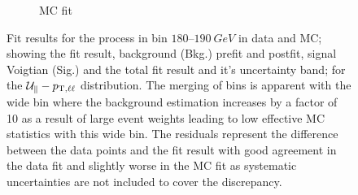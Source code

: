 \begin{figure}[htb]
\begin{subfigure}[b]{0.49\textwidth}
        \caption{MC fit}
        \label{subfigb:metres-fit-examples}
    \end{subfigure}
    \caption[Fit result to extract the recoil scale and resolution in data and simulation.]{
        Fit results for the \IDYmm process in \ptll bin $180$--$\SI{190}{GeV}$ in data and MC; showing the fit result, background (Bkg.) prefit and postfit, signal Voigtian (Sig.) and the total fit result and it's uncertainty band; for the $\mathcal{U}_{\parallel}-p_{\mathrm{T},\ell\ell}$ distribution. The merging of bins is apparent with the wide bin where the background estimation increases by a factor of 10 as a result of large event weights leading to low effective MC statistics with this wide bin. The residuals represent the difference between the data points and the fit result with good agreement in the data fit and slightly worse in the MC fit as systematic uncertainties are not included to cover the discrepancy.
    }
    \label{fig:metres-fit-examples}
\end{figure}

